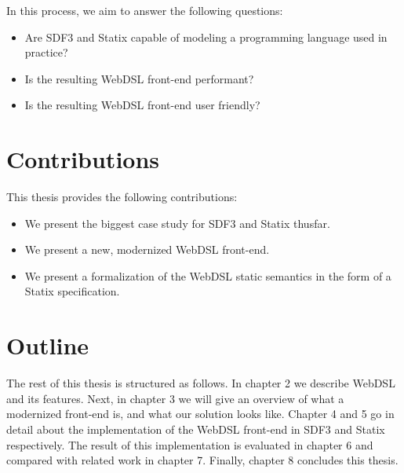   In this process, we aim to answer the following questions:
  \begin{itemize}
    \item Are SDF3 and Statix capable of modeling a programming language used in practice?
    \item Is the resulting WebDSL front-end performant?
    \item Is the resulting WebDSL front-end user friendly?
  \end{itemize}

  \section{Contributions}
    This thesis provides the following contributions:

    \begin{itemize}
      \item We present the biggest case study for SDF3 and Statix thusfar.
      \item We present a new, modernized WebDSL front-end.
      \item We present a formalization of the WebDSL static semantics in the form of a Statix specification.
    \end{itemize}

  \section{Outline}
    The rest of this thesis is structured as follows. In chapter 2 we describe WebDSL and its features. Next, in chapter 3 we will give an overview of what a modernized front-end is, and what our solution looks like. Chapter 4 and 5 go in detail about the implementation of the WebDSL front-end in SDF3 and Statix respectively. The result of this implementation is evaluated in chapter 6 and compared with related work in chapter 7. Finally, chapter 8 concludes this thesis.
